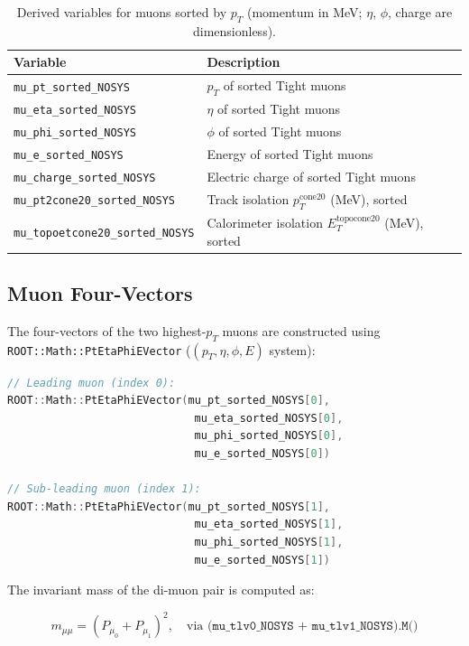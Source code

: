 \documentclass[12pt,a4paper]{article}
\begin{document}
\begin{table}[h!]
\centering
\caption{Derived variables for muons sorted by $p_T$ (momentum in MeV; $\eta$, $\phi$, charge are dimensionless).}
\begin{tabular}{ll}
\toprule
\textbf{Variable} & \textbf{Description} \\
\midrule
\texttt{mu\_pt\_sorted\_NOSYS}         & $p_T$ of sorted Tight muons \\
\texttt{mu\_eta\_sorted\_NOSYS}        & $\eta$ of sorted Tight muons \\
\texttt{mu\_phi\_sorted\_NOSYS}        & $\phi$ of sorted Tight muons \\
\texttt{mu\_e\_sorted\_NOSYS}          & Energy of sorted Tight muons \\
\texttt{mu\_charge\_sorted\_NOSYS}     & Electric charge of sorted Tight muons \\
\texttt{mu\_pt2cone20\_sorted\_NOSYS}  & Track isolation $p_T^{\text{cone20}}$ (MeV), sorted \\
\texttt{mu\_topoetcone20\_sorted\_NOSYS} & Calorimeter isolation $E_T^{\text{topocone20}}$ (MeV), sorted \\
\bottomrule
\end{tabular}
\end{table}

\subsection{Muon Four-Vectors}

The four-vectors of the two highest-$p_T$ muons are constructed using
\texttt{ROOT::Math::PtEtaPhiEVector} ($(p_T, \eta, \phi, E)$ system):

\begin{lstlisting}[language=C++]
// Leading muon (index 0):
ROOT::Math::PtEtaPhiEVector(mu_pt_sorted_NOSYS[0],
                             mu_eta_sorted_NOSYS[0],
                             mu_phi_sorted_NOSYS[0],
                             mu_e_sorted_NOSYS[0])

// Sub-leading muon (index 1):
ROOT::Math::PtEtaPhiEVector(mu_pt_sorted_NOSYS[1],
                             mu_eta_sorted_NOSYS[1],
                             mu_phi_sorted_NOSYS[1],
                             mu_e_sorted_NOSYS[1])
\end{lstlisting}

The invariant mass of the di-muon pair is computed as:

\begin{equation}
    m_{\mu\mu} = \left( P_{\mu_0} + P_{\mu_1} \right)^2, \quad
    \text{via } \texttt{(mu\_tlv0\_NOSYS + mu\_tlv1\_NOSYS).M()}
\end{equation}
\end{document}
